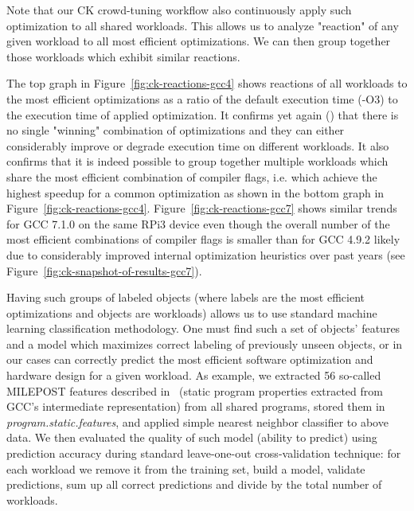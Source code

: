 Note that our CK crowd-tuning workflow also continuously apply
such optimization to all shared workloads.
%
This allows us to analyze "reaction" of any given workload 
to all most efficient optimizations.
%
We can then group together those workloads which exhibit similar reactions.

The top graph in Figure~\ref{fig:ck-reactions-gcc4} shows reactions of all workloads 
to the most efficient optimizations as a ratio of the default execution time (-O3) 
to the execution time of applied optimization.
%
It confirms yet again (\cite{cm:29db2248aba45e59:cd11e3a188574d80}) that there is no single "winning" 
combination of optimizations and they can either considerably improve or degrade execution time 
on different workloads.
%
It also confirms that it is indeed possible to group together multiple workloads 
which share the most efficient combination of compiler flags, i.e. which achieve 
the highest speedup for a common optimization as shown in the bottom graph 
in Figure~\ref{fig:ck-reactions-gcc4}.
%
Figure~\ref{fig:ck-reactions-gcc7} shows similar trends for GCC 7.1.0 on the same RPi3 device
even though the overall number of the most efficient combinations of compiler flags is smaller 
than for GCC 4.9.2 likely due to considerably improved internal optimization heuristics over past years
(see Figure~\ref{fig:ck-snapshot-of-results-gcc7}).

Having such groups of labeled objects (where labels are the most efficient optimizations
and objects are workloads) allows us to use standard machine learning classification methodology.
%
One must find such a set of objects' features and a model which maximizes 
correct labeling of previously unseen objects, or in our cases can correctly predict 
the most efficient software optimization and hardware design for a given workload.
%
As example, we extracted 56 so-called MILEPOST features described in~\cite{29db2248aba45e59:a31e374796869125} 
(static program properties extracted from GCC's intermediate representation) 
from all shared programs, stored them in \emph{program.static.features},
and applied simple nearest neighbor classifier to above data.
%
We then evaluated the quality of such model (ability to predict) using prediction accuracy
during standard leave-one-out cross-validation technique: for each workload we remove it
from the training set, build a model, validate predictions, sum up all correct predictions 
and divide by the total number of workloads.

